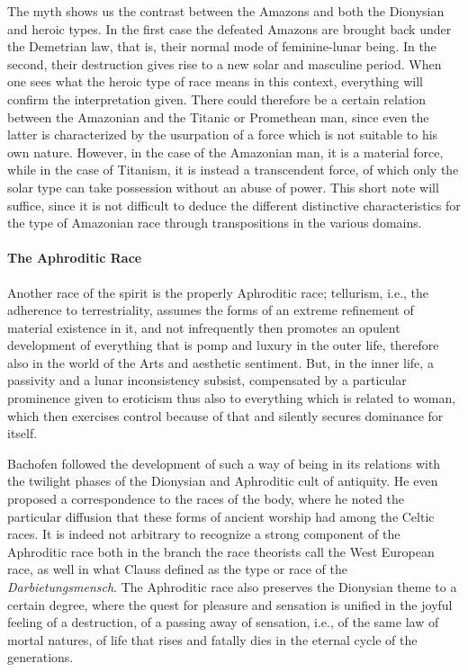 The myth shows us the contrast between the Amazons and both the Dionysian and heroic types. In the first case the defeated Amazons are brought back under the Demetrian law, that is, their normal mode of feminine-lunar being. In the second, their destruction gives rise to a new solar and masculine period. When one sees what the heroic type of race means in this context, everything will confirm the interpretation given. There could therefore be a certain relation between the Amazonian and the Titanic or Promethean man, since even the latter is characterized by the usurpation of a force which is not suitable to his own nature. However, in the case of the Amazonian man, it is a material force, while in the case of Titanism, it is instead a transcendent force, of which only the solar type can take possession without an abuse of power. This short note will suffice, since it is not difficult to deduce the different distinctive characteristics for the type of Amazonian race through transpositions in the various domains.

\paragraph{The Aphroditic Race}
Another race of the spirit is the properly Aphroditic race; tellurism, i.e., the adherence to terrestriality, assumes the forms of an extreme refinement of material existence in it, and not infrequently then promotes an opulent development of everything that is pomp and luxury in the outer life, therefore also in the world of the Arts and aesthetic sentiment. But, in the inner life, a passivity and a lunar inconsistency subsist, compensated by a particular prominence given to eroticism thus also to everything which is related to woman, which then exercises control because of that and silently secures dominance for itself.

Bachofen followed the development of such a way of being in its relations with the twilight phases of the Dionysian and Aphroditic cult of antiquity. He even proposed a correspondence to the races of the body, where he noted the particular diffusion that these forms of ancient worship had among the Celtic races. It is indeed not arbitrary to recognize a strong component of the Aphroditic race both in the branch the race theorists call the West European race, as well in what Clauss defined as the type or race of the \emph{Darbietungsmensch}. The Aphroditic race also preserves the Dionysian theme to a certain degree, where the quest for pleasure and sensation is unified in the joyful feeling of a destruction, of a passing away of sensation, i.e., of the same law of mortal natures, of life that rises and fatally dies in the eternal cycle of the generations.

